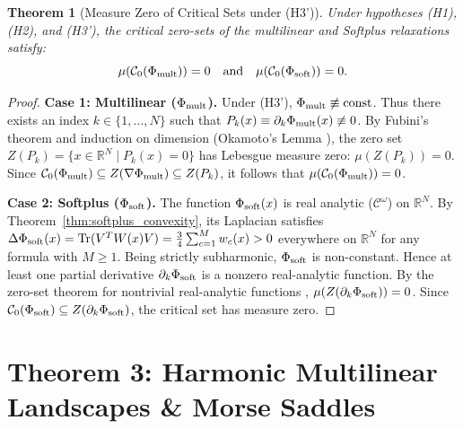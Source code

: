 \documentclass[11pt,a4paper]{article}
\newtheorem{theorem}{Theorem}[section]
\begin{document}
\begin{theorem}[Measure Zero of Critical Sets under (H3')]
\label{thm:measure_zero}
Under hypotheses (H1), (H2), and (H3'), the critical zero-sets of the multilinear and Softplus relaxations satisfy:
\begin{equation}
\mu(\mathcal{C}_0(\Phi_{\rm mult})) = 0 \quad\text{and}\quad \mu(\mathcal{C}_0(\Phi_{\rm soft})) = 0.
\end{equation}
\end{theorem}

\begin{proof}
\textbf{Case 1: Multilinear ($\Phi_{\rm mult}$).}
Under (H3'), $\Phi_{\rm mult} \not\equiv \text{const}$. Thus there exists an index $k \in \{1, \dots, N\}$ such that $P_k(x) \equiv \partial_k \Phi_{\rm mult}(x) \not\equiv 0$. By Fubini's theorem and induction on dimension (Okamoto's Lemma \cite{okamoto1973distinctness, caron2005zero}), the zero set $Z(P_k) = \{x \in \mathbb{R}^N \mid P_k(x) = 0\}$ has Lebesgue measure zero: $\mu(Z(P_k)) = 0$. Since $\mathcal{C}_0(\Phi_{\rm mult}) \subseteq Z(\nabla \Phi_{\rm mult}) \subseteq Z(P_k)$, it follows that $\mu(\mathcal{C}_0(\Phi_{\rm mult})) = 0$.

\textbf{Case 2: Softplus ($\Phi_{\rm soft}$).}
The function $\Phi_{\rm soft}(x)$ is real analytic ($\mathcal{C}^\omega$) on $\mathbb{R}^N$. By Theorem~\ref{thm:softplus_convexity}, its Laplacian satisfies $\Delta \Phi_{\rm soft}(x) = \text{Tr}(V^T W(x) V) = \frac{3}{4} \sum_{c=1}^M w_c(x) > 0$ everywhere on $\mathbb{R}^N$ for any formula with $M \ge 1$. Being strictly subharmonic, $\Phi_{\rm soft}$ is non-constant. Hence at least one partial derivative $\partial_k\Phi_{\rm soft}$ is a nonzero real-analytic function. By the zero-set theorem for nontrivial real-analytic functions \cite{krantz2002primer}, $\mu(Z(\partial_k\Phi_{\rm soft}))=0$. Since $\mathcal C_0(\Phi_{\rm soft})\subseteq Z(\partial_k\Phi_{\rm soft})$, the critical set has measure zero.
\end{proof}

\section{Theorem 3: Harmonic Multilinear Landscapes \& Morse Saddles}
\end{document}
